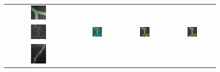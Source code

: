 \begin{figure}[th]
\begin{tabular}{@{}cccc@{}}
\includegraphics[width=0.24\textwidth]{images/L2S_compare/L2S_1}	
\\
\includegraphics[width=0.24\textwidth]{images/L2S_compare/orig_4}	&
\includegraphics[width=0.24\textwidth]{images/L2S_compare/GAC_4}	&
\includegraphics[width=0.24\textwidth]{images/L2S_compare/CV_4}		&
\includegraphics[width=0.24\textwidth]{images/L2S_compare/L2S_4}	
\\
\includegraphics[width=0.24\textwidth]{images/L2S_compare/orig_5}	&

\end{tabular}
\end{figure}
